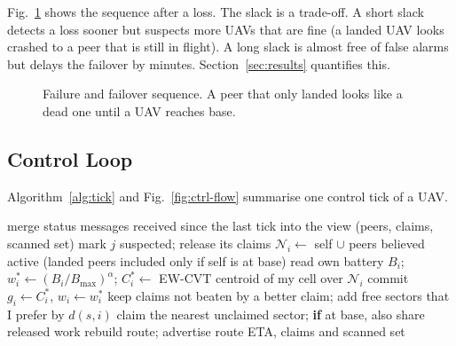 \documentclass[10pt,letterpaper]{article}
\begin{document}
Fig.~\ref{fig:failover} shows the sequence after a loss. The slack is a trade-off. A short slack detects a loss sooner but suspects more UAVs that are fine (a landed UAV looks crashed to a peer that is still in flight). A long slack is almost free of false alarms but delays the failover by minutes. Section~\ref{sec:results} quantifies this.


\begin{figure}[htbp]
\centering
{}
\caption{Failure and failover sequence. A peer that only landed looks like a dead one until a UAV reaches base.}\label{fig:failover}
\end{figure}

\subsection{Control Loop}
Algorithm~\ref{alg:tick} and Fig.~\ref{fig:ctrl-flow} summarise one control tick of a UAV.

\begin{algorithm}[H]
\caption{Control tick of one UAV (every 5\,s).}\label{alg:tick}
\small
\begin{algorithmic}[1]
\State merge status messages received since the last tick into the view (peers, claims, scanned set)
 mark $j$ suspected; release its claims
\EndFor
\State $\mathcal N_i\leftarrow$ self $\cup$ peers believed active (landed peers included only if self is at base)
\State read own battery $B_i$; $w_i^*\leftarrow(B_i/B_{\max})^{\alpha}$; $C_i^*\leftarrow$ EW-CVT centroid of my cell over $\mathcal N_i$
 commit $g_i\leftarrow C_i^*$, $w_i\leftarrow w_i^*$
\EndIf
\State keep claims not beaten by a better claim; add free sectors that I prefer by $d(s,i)$
 claim the nearest unclaimed sector; \textbf{if} at base, also share released work
\EndIf
{} rebuild route; advertise route ETA, claims and scanned set
\EndIf
\end{algorithmic}
\end{algorithm}
\end{document}
